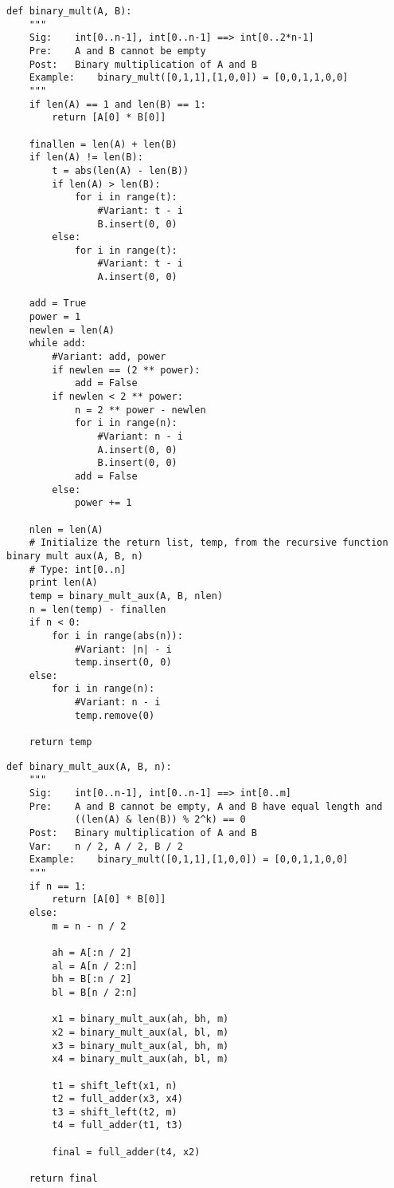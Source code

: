 \documentclass{article}
\begin{document}
\begin{lstlisting}[caption={Code for Binary Mult},captionpos=b]
def binary_mult(A, B):
    """
    Sig:    int[0..n-1], int[0..n-1] ==> int[0..2*n-1]
    Pre:    A and B cannot be empty
    Post:   Binary multiplication of A and B   
    Example:    binary_mult([0,1,1],[1,0,0]) = [0,0,1,1,0,0]
    """
    if len(A) == 1 and len(B) == 1:
        return [A[0] * B[0]]

    finallen = len(A) + len(B)
    if len(A) != len(B):
        t = abs(len(A) - len(B))
        if len(A) > len(B):
            for i in range(t):
                #Variant: t - i
                B.insert(0, 0)
        else:
            for i in range(t):
                #Variant: t - i
                A.insert(0, 0)

    add = True
    power = 1
    newlen = len(A)
    while add:
        #Variant: add, power
        if newlen == (2 ** power):
            add = False
        if newlen < 2 ** power:
            n = 2 ** power - newlen
            for i in range(n):
                #Variant: n - i
                A.insert(0, 0)
                B.insert(0, 0)
            add = False
        else:
            power += 1
            
    nlen = len(A)
    # Initialize the return list, temp, from the recursive function binary mult aux(A, B, n)
    # Type: int[0..n]
    print len(A)
    temp = binary_mult_aux(A, B, nlen)
    n = len(temp) - finallen
    if n < 0:
        for i in range(abs(n)):
            #Variant: |n| - i
            temp.insert(0, 0)
    else:
        for i in range(n):
            #Variant: n - i
            temp.remove(0)

    return temp
\end{lstlisting}

\begin{lstlisting}[caption={Code for Binary Mult Aux},captionpos=b]
def binary_mult_aux(A, B, n):
    """
    Sig:    int[0..n-1], int[0..n-1] ==> int[0..m]
    Pre:    A and B cannot be empty, A and B have equal length and 
    		((len(A) & len(B)) % 2^k) == 0   
    Post:   Binary multiplication of A and B
    Var:    n / 2, A / 2, B / 2
    Example:    binary_mult([0,1,1],[1,0,0]) = [0,0,1,1,0,0]
    """
    if n == 1:
        return [A[0] * B[0]]
    else:
        m = n - n / 2

        ah = A[:n / 2]
        al = A[n / 2:n]
        bh = B[:n / 2]
        bl = B[n / 2:n]

        x1 = binary_mult_aux(ah, bh, m)
        x2 = binary_mult_aux(al, bl, m)
        x3 = binary_mult_aux(al, bh, m)
        x4 = binary_mult_aux(ah, bl, m)

        t1 = shift_left(x1, n)
        t2 = full_adder(x3, x4)
        t3 = shift_left(t2, m)
        t4 = full_adder(t1, t3)

        final = full_adder(t4, x2)

    return final
\end{lstlisting}
\end{document}
